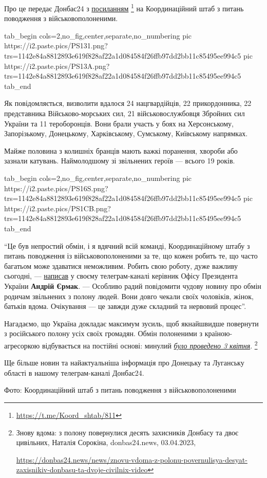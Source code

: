 Про це передає Донбас24 з \href{https://t.me/Koord_shtab/811}{посиланням}%
\footnote{\url{https://t.me/Koord_shtab/811}}
на Координаційний штаб з питань поводження з військовополоненими.

\ifcmt
  tab_begin cols=2,no_fig,center,separate,no_numbering
     pic https://i2.paste.pics/PS131.png?trs=1142e84a8812893e619f828af22a1d084584f26ffb97dd2bb11c85495ee994c5
     pic https://i2.paste.pics/PS13A.png?trs=1142e84a8812893e619f828af22a1d084584f26ffb97dd2bb11c85495ee994c5
  tab_end
\fi

Як повідомляється, визволити вдалося 24 нацгвардійців, 22 прикордонника, 22
представника Військово-морських сил, 21 військовослужбовця Збройних сил України
та 11 тероборонців. Вони брали участь у боях на Херсонському, Запорізькому,
Донецькому, Харківському, Сумському, Київському напрямках.

Майже половина з колишніх бранців мають важкі поранення, хвороби або зазнали
катувань. Наймолодшому зі звільнених героїв — всього 19 років.


\ifcmt
  tab_begin cols=2,no_fig,center,separate,no_numbering
     pic https://i2.paste.pics/PS16S.png?trs=1142e84a8812893e619f828af22a1d084584f26ffb97dd2bb11c85495ee994c5
     pic https://i2.paste.pics/PS1CB.png?trs=1142e84a8812893e619f828af22a1d084584f26ffb97dd2bb11c85495ee994c5
  tab_end
\fi

\begin{leftbar}
\enquote{Це був непростий обмін, і я вдячний всій команді, Координаційному штабу з
питань поводження із військовополоненими за те, що кожен робить те, що часто
багатьом може здаватися неможливим. Робить свою роботу, дуже важливу
сьогодні, — \href{https://t.me/ermaka2022/2414}{написав} %
у своєму телеграм-каналі керівник Офісу Президента
України \textbf{Андрій Єрмак}. — Особливо радий повідомити чудову новину про обмін
родичам звільнених з полону людей. Вони довго чекали своїх чоловіків, жінок,
батьків вдома. Очікування — це завжди дуже складний та нервовий процес}.
\end{leftbar}


Нагадаємо, що Україна докладає максимум зусиль, щоб якнайшвидше повернути з
російського полону усіх своїх громадян. Обмін полоненими з країною-агресоркою
відбувається на постійні основі: минулий \href{https://donbas24.news/news/znovu-vdoma-z-polonu-povernulisya-desyat-zaxisnikiv-donbasu-ta-dvoje-civilnix-video}{\emph{було проведено 3 квітня}}.%
\footnote{Знову вдома: з полону повернулися десять захисників Донбасу та двоє цивільних, Наталія Сорокіна, donbas24.news, 03.04.2023, \par\url{https://donbas24.news/news/znovu-vdoma-z-polonu-povernulisya-desyat-zaxisnikiv-donbasu-ta-dvoje-civilnix-video}}

Ще більше новин та найактуальніша інформація про Донецьку та Луганську області
в нашому телеграм-каналі Донбас24.

Фото: Координаційний штаб з питань поводження з військовополоненими


